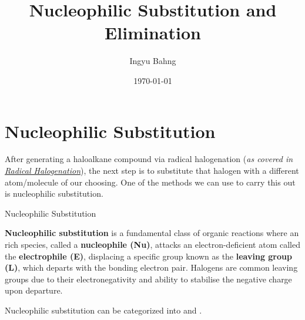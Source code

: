 \documentclass[10pt]{article}
\title{Nucleophilic Substitution and Elimination}
\date{\today}
\author{Ingyu Bahng}
\begin{document}


\section{Nucleophilic Substitution}

  After generating a haloalkane compound via radical halogenation (\textit{as covered in \href{../radical_halogenation/radical_halogenation.pdf}{Radical Halogenation}}), the next step is to substitute that halogen with a different atom/molecule of our choosing. One of the methods we can use to carry this out is nucleophilic substitution.

  \begin{core}{Nucleophilic Substitution}
   
    \textbf{Nucleophilic substitution} is a fundamental class of organic reactions where an  rich species, called a \textbf{nucleophile (Nu)}, attacks an electron-deficient atom called the \textbf{electrophile (E)}, displacing a specific group known as the \textbf{leaving group (L)}, which departs with the bonding electron pair. Halogens are common leaving groups due to their electronegativity and ability to stabilise the negative charge upon departure.

  \end{core}

  Nucleophilic substitution can be categorized into \snt and \sno.
\end{document}
